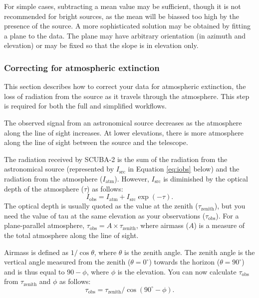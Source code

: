 \documentclass[oneside,11pt]{starlink}
\begin{document}
For simple cases, subtracting a mean value may be sufficient, though
it is not recommended for bright sources, as the mean will be biassed
too high by the presence of the source. A more sophisticated solution
may be obtained by fitting a plane to the data. The plane may have
arbitrary orientation (in azimuth and elevation) or may be fixed so
that the slope is in elevation only.

\subsubsection{Correcting for atmospheric extinction\label{se:extinction}}

This section describes how to correct your data for atmospheric
extinction, the loss of radiation from the source as it travels
through the atmosphere. This step is required for both the full and
simplified workflows.

The observed signal from an astronomical source decreases as the
atmosphere along the line of sight increases. At lower elevations,
there is more atmosphere along the line of sight between the source
and the telescope.

The radiation received by SCUBA-2 is the sum of the radiation from the
astronomical source (represented by $I_{\textrm{src}}$ in Equation
\ref{eq:iobs} below) and the radiation from the atmosphere ($I_{\textrm{atm}}$). However, $I_{\textrm{src}}$ is diminished by the optical depth
of the atmosphere ($\tau$) as follows:
\begin{equation}
I_{\textrm{obs}} = I_{\textrm{atm}} + I_{\textrm{src}} \exp(-\tau).
\label{eq:iobs}
\end{equation}
The optical depth is usually quoted as the value at the zenith
($\tau_{\textrm{zenith}}$), but you need the value of tau at the same
elevation as your observations ($\tau_{\textrm{obs}}$). For a
plane-parallel atmosphere, $\tau_{\textrm{obs}} = A \times \tau_{\textrm{zenith}}$, where airmass ($A$) is a measure of the total atmosphere
along the line of sight.

Airmass is defined as $1 / \cos \theta$, where $\theta$ is the zenith
angle. The zenith angle is the vertical angle measured from the zenith
($\theta = 0^\circ$) towards the horizon ($\theta = 90^\circ$) and is
thus equal to $90-\phi$, where $\phi$ is the elevation. You can now
calculate $\tau_{\textrm{obs}}$ from $\tau_{\textrm{zenith}}$ and $\phi$ as
follows:
\begin{equation}
\tau_{\textrm{obs}} = \tau_{\textrm{zenith}} / \cos(90^\circ - \phi ).
\label{eq:tau}
\end{equation}
\end{document}

